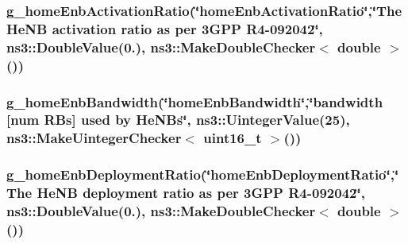 \subsubsection[{\texorpdfstring{g\+\_\+home\+Enb\+Activation\+Ratio}{g_homeEnbActivationRatio}}]{ g\+\_\+home\+Enb\+Activation\+Ratio(\char`\"{}home\+Enb\+Activation\+Ratio\char`\"{},\char`\"{}The He\+NB activation ratio as per 3\+G\+P\+P R4-\/092042\char`\"{}, ns3\+::\+Double\+Value(0.), ns3\+::\+Make\+Double\+Checker$<$ double $>$())\hspace{0.3cm}{\ttfamily [static]}}\hypertarget{lena-dual-stripe_8cc_aa422cb0fc368952f6203db9f26fc7f0c}{}\label{lena-dual-stripe_8cc_aa422cb0fc368952f6203db9f26fc7f0c}
\subsubsection[{\texorpdfstring{g\+\_\+home\+Enb\+Bandwidth}{g_homeEnbBandwidth}}]{ g\+\_\+home\+Enb\+Bandwidth(\char`\"{}home\+Enb\+Bandwidth\char`\"{},\char`\"{}bandwidth \mbox{[}num R\+Bs\mbox{]} used by He\+N\+Bs\char`\"{}, ns3\+::\+Uinteger\+Value(25), {\bf ns3\+::\+Make\+Uinteger\+Checker}$<$ uint16\+\_\+t $>$())\hspace{0.3cm}{\ttfamily [static]}}\hypertarget{lena-dual-stripe_8cc_a80f8c4c7cba662b86948cf8f72b0b488}{}\label{lena-dual-stripe_8cc_a80f8c4c7cba662b86948cf8f72b0b488}
\subsubsection[{\texorpdfstring{g\+\_\+home\+Enb\+Deployment\+Ratio}{g_homeEnbDeploymentRatio}}]{ g\+\_\+home\+Enb\+Deployment\+Ratio(\char`\"{}home\+Enb\+Deployment\+Ratio\char`\"{},\char`\"{}The He\+NB deployment ratio as per 3\+G\+P\+P R4-\/092042\char`\"{}, ns3\+::\+Double\+Value(0.), ns3\+::\+Make\+Double\+Checker$<$ double $>$())\hspace{0.3cm}{\ttfamily [static]}}\hypertarget{lena-dual-stripe_8cc_a3882599d6730a3f262a4ba0ba6913192}{}\label{lena-dual-stripe_8cc_a3882599d6730a3f262a4ba0ba6913192}

